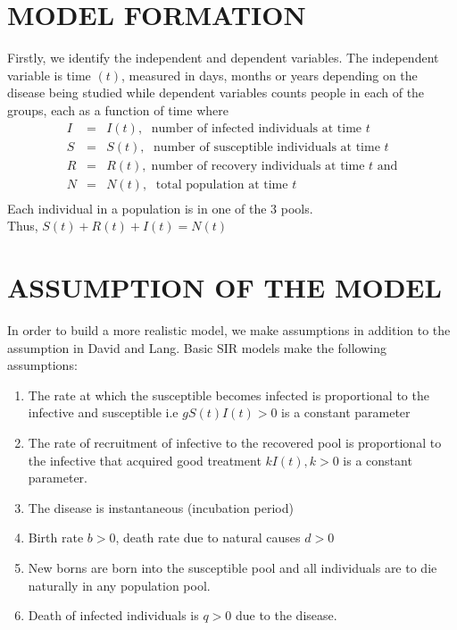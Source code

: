 \documentclass[12pt]{report}
\begin{document}
   \section{MODEL FORMATION}  
   Firstly, we identify the independent and dependent variables. The independent variable is time $(t)$, measured in days, months or years depending on the disease being studied while dependent variables counts people in each of the groups, each as a function of time where
   \begin{eqnarray*}
   	I &=&I(t), \; \text{ number of infected individuals at time $t$}\\
   	S &=&S(t), \; \text{ number of susceptible individuals at time $t$}\\
   	R &=& R(t), \; \text{number of recovery individuals at time $t$ and}\\
   	N &=&N(t), \; \text{ total population at time $t$}\\
   \end{eqnarray*}
   Each individual in a population is in one of the 3 pools.\\
   Thus, $S(t) + R(t) + I(t) = N(t)$\\
   
   \section{ASSUMPTION OF THE MODEL}
   In order to build a more realistic model, we make assumptions in addition to the assumption in David and Lang. Basic SIR models make the following assumptions:
   \begin{enumerate}
   	\item The rate at which the susceptible becomes infected is proportional to the infective and susceptible i.e $gS(t)I(t) >0$ is a constant parameter 
   	
   	\item The rate of recruitment of infective to the recovered pool is proportional to the infective that acquired good treatment $kI(t), k>0$ is a constant parameter.
   	
   	\item The disease is instantaneous (incubation period)
   	
   	\item Birth rate $b>0$, death rate due to natural causes $d>0$
   	
   	\item New borns are born into the susceptible pool and all individuals are to die naturally in any population pool.
   	
   	\item Death of infected individuals is $q>0$ due to the disease.
  
   \end{enumerate}
	
\end{document}
